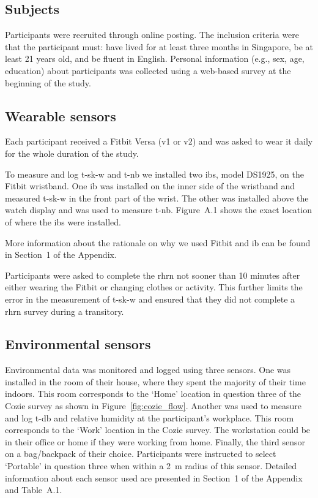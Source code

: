 \subsection{Subjects}\label{subsec:subjects}
Participants were recruited through online posting.
The inclusion criteria were that the participant must: have lived for at least three months in Singapore, be at least 21 years old, and be fluent in English.
Personal information (e.g., sex, age, education) about participants was collected using a web-based survey at the beginning of the study.

\subsection{Wearable sensors}\label{subsec:wearables}
Each participant received a Fitbit Versa (v1 or v2) and was asked to wear it daily for the whole duration of the study.

To measure and log \ac{t-sk-w} and \ac{t-nb} we installed two \glspl{ib}, model DS1925, on the Fitbit wristband.
One \gls{ib} was installed on the inner side of the wristband and measured \ac{t-sk-w} in the front part of the wrist.
The other was installed above the watch display and was used to measure \ac{t-nb}.
Figure~A.1 shows the exact location of where the \glspl{ib} were installed.

More information about the rationale on why we used Fitbit and \gls{ib} can be found in Section~1 of the Appendix.

Participants were asked to complete the \ac{rhrn} not sooner than 10 minutes after either wearing the Fitbit or changing clothes or activity.
This further limits the error in the measurement of \ac{t-sk-w} and ensured that they did not complete a \ac{rhrn} survey during a transitory.

\subsection{Environmental sensors}\label{subsec:environmental-loggers}
Environmental data was monitored and logged using three sensors.
One was installed in the room of their house, where they spent the majority of their time indoors.
This room corresponds to the `Home' location in question three of the Cozie survey as shown in Figure~\ref{fig:cozie_flow}.
Another was used to measure and log \ac{t-db} and relative humidity at the participant's workplace.
This room corresponds to the `Work' location in the Cozie survey.
The workstation could be in their office or home if they were working from home.
Finally, the third sensor on a bag/backpack of their choice.
Participants were instructed to select `Portable' in question three when within a 2~m radius of this sensor.
Detailed information about each sensor used are presented in Section~1 of the Appendix and Table~A.1.

